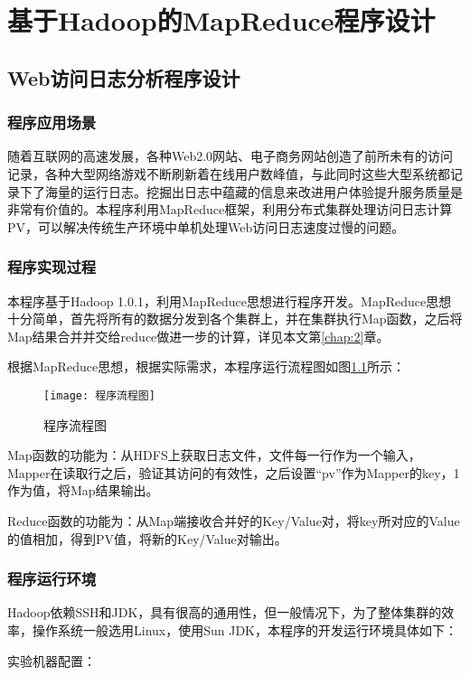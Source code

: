 \chapter{基于Hadoop的MapReduce程序设计}
\label{chap:3}

\section{Web访问日志分析程序设计}
\subsection{程序应用场景}
随着互联网的高速发展，各种Web2.0网站、电子商务网站创造了前所未有的访问记录，各种大型网络游戏不断刷新着在线用户数峰值，与此同时这些大型系统都记录下了海量的运行日志。挖掘出日志中蕴藏的信息来改进用户体验提升服务质量是非常有价值的。本程序利用MapReduce框架，利用分布式集群处理访问日志计算PV，可以解决传统生产环境中单机处理Web访问日志速度过慢的问题。

\subsection{程序实现过程}
本程序基于Hadoop 1.0.1，利用MapReduce思想进行程序开发。MapReduce思想十分简单，首先将所有的数据分发到各个集群上，并在集群执行Map函数，之后将Map结果合并并交给reduce做进一步的计算，详见本文第\ref{chap:2}章。

根据MapReduce思想，根据实际需求，本程序运行流程图如图\ref{fig:程序流程图}所示：

\begin{figure}[h]
 \centering
 \texttt{[image: 程序流程图]}
 \caption{程序流程图}
 \label{fig:程序流程图}
\end{figure}

Map函数的功能为：从HDFS上获取日志文件，文件每一行作为一个输入，Mapper在读取行之后，验证其访问的有效性，之后设置“pv”作为Mapper的key，1作为值，将Map结果输出。

Reduce函数的功能为：从Map端接收合并好的Key/Value对，将key所对应的Value的值相加，得到PV值，将新的Key/Value对输出。

\subsection{程序运行环境}
Hadoop依赖SSH和JDK，具有很高的通用性，但一般情况下，为了整体集群的效率，操作系统一般选用Linux，使用Sun JDK，本程序的开发运行环境具体如下：

实验机器配置：

